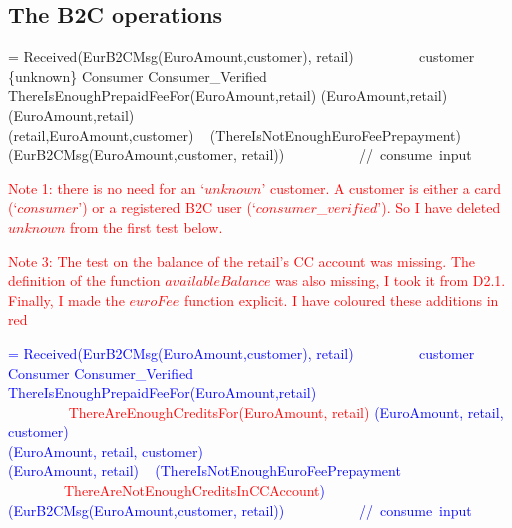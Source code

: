  \subsection{The B2C operations}
 
 \begin{asm}
 =\+
 \IF Received(EurB2CMsg(EuroAmount,\FROM customer), \FROM retail) \AND \+
 ~~~~~~~~
 customer \in  \{unknown\} \cup Consumer \cup Consumer\_Verified \THEN \\
 \IF ThereIsEnoughPrepaidFeeFor(EuroAmount,retail) \THEN \+
 (EuroAmount,retail)\\
 (EuroAmount,\FOR retail) \\ 
 (retail,EuroAmount,customer)\-
 \ELSE ~ (ThereIsNotEnoughEuroFeePrepayment)    \\
 (EurB2CMsg(EuroAmount,\FROM customer, \FOR retail)) 
 \mbox{~~~~~~~~~ // consume input} 
\end{asm}

 \textcolor{red}{Note 1: there is no need for an `$unknown$' customer. A customer is either a card (`$consumer$') or a registered B2C user (`$consumer$\_$verified$'). So I have deleted $unknown$ from the first test below.}

\textcolor{red}{Note 3: The test on the balance of the retail's CC account was missing. The definition of the function $availableBalance$ was also missing, I took it from D2.1. Finally, I made the $euroFee$ function explicit. I have coloured these additions in red}

\textcolor{blue}{
\begin{asm}
 = \+
 \IF Received(EurB2CMsg(EuroAmount,\FROM customer), \FROM retail) \AND \+
 ~~~~~~~~
 customer \in  Consumer \cup Consumer\_Verified \THEN \\
 \IF ThereIsEnoughPrepaidFeeFor(EuroAmount,retail) \\
 ~~~~~~~~ \textcolor{red}{\AND ThereAreEnoughCreditsFor(EuroAmount, retail)} \THEN \+
 (EuroAmount, retail, customer)\\
 (EuroAmount, retail, customer)\\
 (EuroAmount, retail) \-
 \ELSE ~ (ThereIsNotEnoughEuroFeePrepayment \\
 ~~~~~~~~\textcolor{red}{\OR ThereAreNotEnoughCreditsInCCAccount}) \-
 (EurB2CMsg(EuroAmount,\FROM customer, \FROM retail)) 
 \mbox{~~~~~~~~~ // consume input} 
 \end{asm}
}
 
